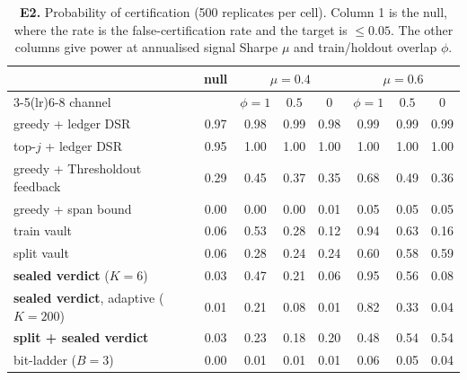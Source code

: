 \begin{table}[t]\centering\small
\caption{\textbf{E2.} Probability of certification (500 replicates per cell). Column 1 is the null, where the rate is the false-certification rate and the target is $\le0.05$. The other columns give power at annualised signal Sharpe $\mu$ and train/holdout overlap $\phi$.}\label{tab:e2}
\begin{tabular}{l c ccc ccc}\toprule
 & null & \multicolumn{3}{c}{$\mu=0.4$} & \multicolumn{3}{c}{$\mu=0.6$}\\\cmidrule(lr){3-5}\cmidrule(lr){6-8}
channel & & $\phi{=}1$ & $0.5$ & $0$ & $\phi{=}1$ & $0.5$ & $0$\\\midrule
greedy + ledger DSR & \textcolor{red!70!black}{0.97} & 0.98 & 0.99 & 0.98 & 0.99 & 0.99 & 0.99\\
top-$j$ + ledger DSR & \textcolor{red!70!black}{0.95} & 1.00 & 1.00 & 1.00 & 1.00 & 1.00 & 1.00\\
greedy + Thresholdout feedback & \textcolor{red!70!black}{0.29} & 0.45 & 0.37 & 0.35 & 0.68 & 0.49 & 0.36\\
\midrule
greedy + span bound & 0.00 & 0.00 & 0.00 & 0.01 & 0.05 & 0.05 & 0.05\\
train vault & 0.06 & 0.53 & 0.28 & 0.12 & 0.94 & 0.63 & 0.16\\
split vault & 0.06 & 0.28 & 0.24 & 0.24 & 0.60 & 0.58 & 0.59\\
\textbf{sealed verdict} ($K=6$) & 0.03 & 0.47 & 0.21 & 0.06 & 0.95 & 0.56 & 0.08\\
\textbf{sealed verdict}, adaptive ($K=200$) & 0.01 & 0.21 & 0.08 & 0.01 & 0.82 & 0.33 & 0.04\\
\textbf{split + sealed verdict} & 0.03 & 0.23 & 0.18 & 0.20 & 0.48 & 0.54 & 0.54\\
bit-ladder ($B=3$) & 0.00 & 0.01 & 0.01 & 0.01 & 0.06 & 0.05 & 0.04\\
\bottomrule\end{tabular}\end{table}
